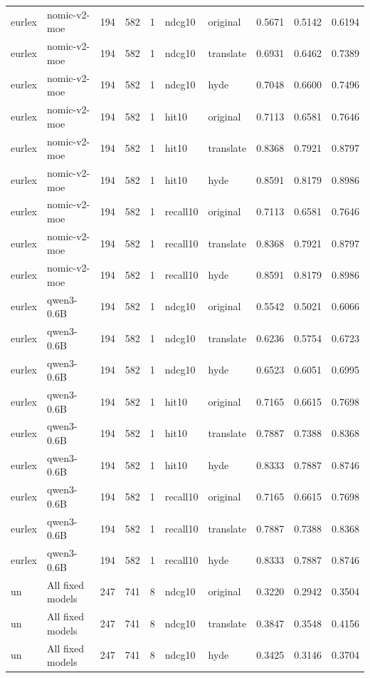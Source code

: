 \begin{tabular}{llrrrllrrr}
eurlex & nomic-v2-moe & 194 & 582 & 1 & ndcg10 & original & 0.5671 & 0.5142 & 0.6194 \\
eurlex & nomic-v2-moe & 194 & 582 & 1 & ndcg10 & translate & 0.6931 & 0.6462 & 0.7389 \\
eurlex & nomic-v2-moe & 194 & 582 & 1 & ndcg10 & hyde & 0.7048 & 0.6600 & 0.7496 \\
eurlex & nomic-v2-moe & 194 & 582 & 1 & hit10 & original & 0.7113 & 0.6581 & 0.7646 \\
eurlex & nomic-v2-moe & 194 & 582 & 1 & hit10 & translate & 0.8368 & 0.7921 & 0.8797 \\
eurlex & nomic-v2-moe & 194 & 582 & 1 & hit10 & hyde & 0.8591 & 0.8179 & 0.8986 \\
eurlex & nomic-v2-moe & 194 & 582 & 1 & recall10 & original & 0.7113 & 0.6581 & 0.7646 \\
eurlex & nomic-v2-moe & 194 & 582 & 1 & recall10 & translate & 0.8368 & 0.7921 & 0.8797 \\
eurlex & nomic-v2-moe & 194 & 582 & 1 & recall10 & hyde & 0.8591 & 0.8179 & 0.8986 \\
eurlex & qwen3-0.6B & 194 & 582 & 1 & ndcg10 & original & 0.5542 & 0.5021 & 0.6066 \\
eurlex & qwen3-0.6B & 194 & 582 & 1 & ndcg10 & translate & 0.6236 & 0.5754 & 0.6723 \\
eurlex & qwen3-0.6B & 194 & 582 & 1 & ndcg10 & hyde & 0.6523 & 0.6051 & 0.6995 \\
eurlex & qwen3-0.6B & 194 & 582 & 1 & hit10 & original & 0.7165 & 0.6615 & 0.7698 \\
eurlex & qwen3-0.6B & 194 & 582 & 1 & hit10 & translate & 0.7887 & 0.7388 & 0.8368 \\
eurlex & qwen3-0.6B & 194 & 582 & 1 & hit10 & hyde & 0.8333 & 0.7887 & 0.8746 \\
eurlex & qwen3-0.6B & 194 & 582 & 1 & recall10 & original & 0.7165 & 0.6615 & 0.7698 \\
eurlex & qwen3-0.6B & 194 & 582 & 1 & recall10 & translate & 0.7887 & 0.7388 & 0.8368 \\
eurlex & qwen3-0.6B & 194 & 582 & 1 & recall10 & hyde & 0.8333 & 0.7887 & 0.8746 \\
un & All fixed models & 247 & 741 & 8 & ndcg10 & original & 0.3220 & 0.2942 & 0.3504 \\
un & All fixed models & 247 & 741 & 8 & ndcg10 & translate & 0.3847 & 0.3548 & 0.4156 \\
un & All fixed models & 247 & 741 & 8 & ndcg10 & hyde & 0.3425 & 0.3146 & 0.3704 \\

\end{tabular}
